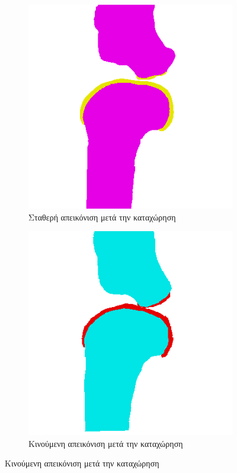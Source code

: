 \documentclass[a4paper,12pt]{article}
\begin{document}
\begin{figure}[H]
    \centering

    \begin{subfigure}[t]{0.4\linewidth}
    \includegraphics[width=\linewidth]{original_label_registration_1.png}
    \caption{Σταθερή απεικόνιση μετά την καταχώρηση}
    \end{subfigure}
    \begin{subfigure}[t]{0.4\linewidth}
    \includegraphics[width=\linewidth]{moving_label_after_registration_1.png}
    \caption{Κινούμενη απεικόνιση μετά την καταχώρηση}
    \end{subfigure}


\end{figure}
\end{document}
